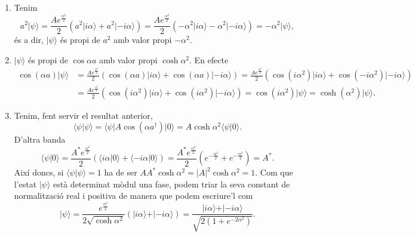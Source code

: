 \documentclass[12pt]{article}
\numberwithin{table}{section}
\numberwithin{figure}{section}
\numberwithin{equation}{section}
\newcommand{\abs}[1]{\lvert #1 \rvert}
\newcommand{\ket}[1]{\vert {#1} \rangle}
\newcommand{\bra}[1]{\langle #1 \vert}
\newcommand{\braket}[2]{\langle {#1} \vert {#2} \rangle}
\begin{document}
\begin{enumerate}[label=(\alph*), font=\bfseries \sffamily, wide, labelwidth=!, labelindent=0pt]
\item Tenim
	\begin{equation*}
		a^2 \ket{\psi} = \frac{Ae^{\frac{\alpha^2}{2}}}{2}(a^2 \ket{i\alpha} + a^2 \ket{-i\alpha}) = \frac{Ae^{\frac{\alpha^2}{2}}}{2}(-\alpha^2 \ket{i\alpha} -\alpha^2 \ket{-i\alpha}) = -\alpha^2 \ket{\psi},
	\end{equation*}
	és a dir, \( \ket{\psi} \) és propi de \( a^2 \) amb valor propi \( -\alpha^2 \). 

\item \( \ket{\psi} \) és propi de \( \cos{\alpha a} \) amb valor propi \( \cosh{\alpha^2} \). En efecte
	\begin{align*}
		\cos{(\alpha a)} \ket{\psi} & = \frac{Ae^{\frac{\alpha^2}{2}}}{2}(\cos{(\alpha a)} \ket{i\alpha} + \cos{(\alpha a)} \ket{-i\alpha}) = \frac{Ae^{\frac{\alpha^2}{2}}}{2}(\cos{(i\alpha^2)} \ket{i\alpha} + \cos{(-i\alpha^2)} \ket{-i\alpha}) \\
																& = \frac{Ae^{\frac{\alpha^2}{2}}}{2}(\cos{(i\alpha^2)} \ket{i\alpha} + \cos{(i\alpha^2)} \ket{-i\alpha}) = \cos{(i\alpha^2)} \ket{\psi} = \cosh{(\alpha^2)} \ket{\psi}.
	\end{align*}
	
\item Tenim, fent servir el resultat anterior,
	\begin{equation*}
		\braket{\psi}{\psi} = \bra{\psi} A \cos{(\alpha a^{\dagger})} \ket{0} = A \cosh{\alpha^2} \braket{\psi}{0}.
	\end{equation*}
D'altra banda
\begin{equation*}
	\braket{\psi}{0} = \frac{A^\ast e^{\frac{\alpha^2}{2}}}{2}\left(\braket{i \alpha}{0} + \braket{-i \alpha}{0} \right) = \frac{A^\ast e^{\frac{\alpha^2}{2}}}{2}\left(e^{-\frac{\alpha^2}{2}} + e^{-\frac{\alpha^2}{2}} \right) = A^\ast. 
\end{equation*}
Així doncs, si \( \braket{\psi}{\psi} = 1 \) ha de ser \( AA^\ast \cosh{\alpha^2} = \abs{A}^2 \cosh{\alpha^2} = 1 \). Com que l'estat \( \ket{\psi} \) està determinat mòdul una fase, podem triar la seva constant de normalització real i positiva de manera que podem escriure'l com 
\begin{equation*}
	\ket{\psi} = \frac{e^{\frac{\alpha^2}{2}}}{2 \sqrt{\cosh{\alpha^2}}} \left(\ket{i \alpha} + \ket{-i \alpha}\right) = \frac{\ket{i \alpha} + \ket{-i \alpha}}{\sqrt{2\left(1 + e^{-2\alpha^2}\right)}} . 
\end{equation*}


\end{enumerate}
\end{document}
